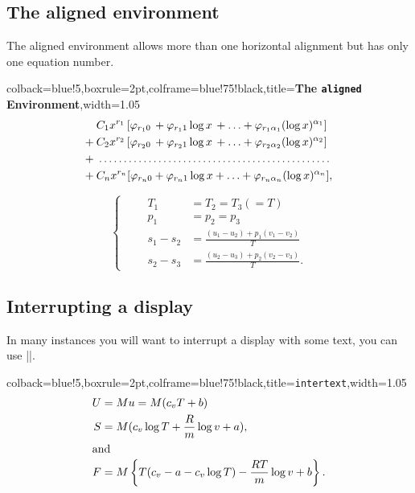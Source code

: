 \subsection{The aligned environment}
The aligned environment allows more than one horizontal alignment but has only one equation number.
\newcommand{\dotsb}{\ldots}			%
\newcommand{\dotsbsmall}{\ldot\!\ldot\!\ldot}
\newcommand{\ldot}{\mathbin{.}}			%
\newcommand{\nobf}[1]{\no \textbf{#1}}		%
\begin{tcblisting}{colback=blue!5,boxrule=2pt,colframe=blue!75!black,title=\textbf{The \texttt{aligned} Environment},width=1.05\textwidth}
\begin{equation}
\begin{aligned}
 &\:C_1x^{r_1}\,[\varphi_{r_1 0} \,+ \varphi_{r_1 1}\log x \,+ \dotsb + \varphi_{r_1 \alpha_1}(\log x)^{\alpha_1}]\\
+&\:C_2x^{r_2}\,[\varphi_{r_2 0} \,+ \varphi_{r_2 1}\log x \,+ \dotsb + \varphi_{r_2 \alpha_2}(\log x)^{\alpha_2}]\\
+&\multispan{1}{\:\dotfill}\\
+&\:C_nx^{r_n}[\varphi_{r_n 0} + \varphi_{r_n 1}\log x + \dotsb + \varphi_{r_n \alpha_n}(\log x)^{\alpha_n}],
\end{aligned}
\end{equation}

\[
\tag{98}
\left\{\qquad
\begin{aligned}
T_1 &= T_2 = T_3 (=T)\\
p_1 &= p_2 = p_3\\
s_1-s_2 &= \frac{(u_1-u_2)+p_1(v_1-v_2)}{T}\\
s_2-s_3 &= \frac{(u_2-u_3)+p_2(v_2-v_3)}{T}.
\end{aligned}
\right.
\]
\end{tcblisting}

\subsection{Interrupting a display}

In many instances you will want to interrupt a display with some text, you can use |\intertext|.

\begin{tcblisting}{colback=blue!5,boxrule=2pt,colframe=blue!75!black,title=\texttt{intertext},width=1.05\textwidth}
\begin{align}
U &= M u = M(c_v T + b)\\
S &= M(c_v  \log T + \frac{R}{m}  \log v + a),\\
\intertext{and}
F &= M \left\{T(c_v - a - c_v \log T) - \frac{RT}{m} \log v + b \right\}.
\end{align}
\end{tcblisting}

